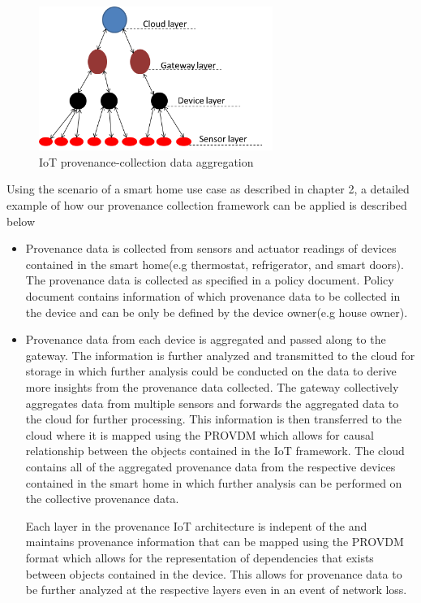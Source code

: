 \begin{figure}[h!]
\begin{center}

\includegraphics[width=3.0in]{iot.PNG}    
\end{center}
\caption{IoT provenance-collection data aggregation}
\label{autom}
\end{figure}


Using the scenario of a smart home use case as described in chapter 2, a detailed example of how our provenance collection framework can be applied is described below

\begin{itemize}

\item Provenance data is collected from sensors and actuator readings of devices contained in the smart home(e.g thermostat, refrigerator, and smart doors). The provenance data is collected as specified in a policy document. Policy document contains information of which provenance data to be collected in the device and can be only be defined by the device owner(e.g house owner). 

\item Provenance data from each device is aggregated and passed along to the gateway. The information is further analyzed and transmitted to the cloud for storage in which further analysis could be conducted on the data to derive more insights from the provenance data collected. The gateway collectively aggregates data from multiple sensors and forwards the aggregated data to the cloud for further processing. This information is then transferred to the cloud where it is mapped using the PROV\-DM which allows for causal relationship between the objects contained in the IoT framework. The cloud contains all of the aggregated provenance data from the respective devices contained in the smart home in which further analysis can be performed on the collective provenance data. 


Each layer in the provenance IoT architecture is indepent of the and maintains provenance information that can be mapped using the PROV\-DM format which allows for the representation of dependencies that exists between objects contained in the device. This allows for provenance data to be further analyzed at the respective layers even in an event of network loss. 



\end{itemize}





